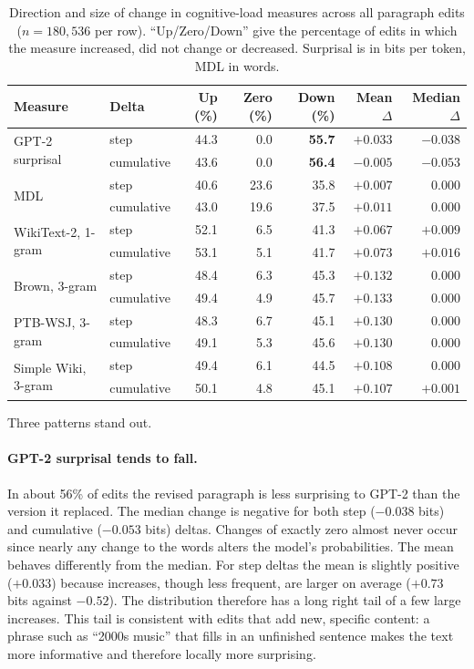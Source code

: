 \documentclass[12pt,a4paper,oneside]{report}
\begin{document}
\begin{table}[ht]
\centering
\small
\caption[Change in cognitive-load measures (paragraph level)]{Direction and size of change in cognitive-load measures across all paragraph edits ($n = 180{,}536$ per row). ``Up/Zero/Down'' give the percentage of edits in which the measure increased, did not change or decreased. Surprisal is in bits per token, MDL in words.}
\label{tab:delta-para}
\setlength{\tabcolsep}{4.5pt}
\begin{tabular}{@{}llrrrrr@{}}
\toprule
Measure & Delta & Up (\%) & Zero (\%) & Down (\%) & Mean $\Delta$ & Median $\Delta$\\
\midrule
\multirow{2}{*}{GPT-2 surprisal} & step & 44.3 & 0.0 & \textbf{55.7} & $+0.033$ & $\mathbf{-0.038}$\\
 & cumulative & 43.6 & 0.0 & \textbf{56.4} & $-0.005$ & $\mathbf{-0.053}$\\
\midrule
\multirow{2}{*}{MDL} & step & 40.6 & 23.6 & 35.8 & $+0.007$ & $0.000$\\
 & cumulative & 43.0 & 19.6 & 37.5 & $+0.011$ & $0.000$\\
\midrule
\multirow{2}{*}{WikiText-2, 1-gram} & step & 52.1 & 6.5 & 41.3 & $+0.067$ & $+0.009$\\
 & cumulative & 53.1 & 5.1 & 41.7 & $+0.073$ & $+0.016$\\
\multirow{2}{*}{Brown, 3-gram} & step & 48.4 & 6.3 & 45.3 & $+0.132$ & $0.000$\\
 & cumulative & 49.4 & 4.9 & 45.7 & $+0.133$ & $0.000$\\
\multirow{2}{*}{PTB-WSJ, 3-gram} & step & 48.3 & 6.7 & 45.1 & $+0.130$ & $0.000$\\
 & cumulative & 49.1 & 5.3 & 45.6 & $+0.130$ & $0.000$\\
\multirow{2}{*}{Simple Wiki, 3-gram} & step & 49.4 & 6.1 & 44.5 & $+0.108$ & $0.000$\\
 & cumulative & 50.1 & 4.8 & 45.1 & $+0.107$ & $+0.001$\\
\bottomrule
\end{tabular}
\end{table}

Three patterns stand out.

\paragraph{GPT-2 surprisal tends to fall.} In about 56\% of edits the revised paragraph is less surprising to GPT-2 than the version it replaced. The median change is negative for both step ($-0.038$ bits) and cumulative ($-0.053$ bits) deltas. Changes of exactly zero almost never occur since nearly any change to the words alters the model's probabilities. The mean behaves differently from the median. For step deltas the mean is slightly positive ($+0.033$) because increases, though less frequent, are larger on average ($+0.73$ bits against $-0.52$). The distribution therefore has a long right tail of a few large increases. This tail is consistent with edits that add new, specific content: a phrase such as ``2000s music'' that fills in an unfinished sentence makes the text more informative and therefore locally more surprising.
\end{document}
